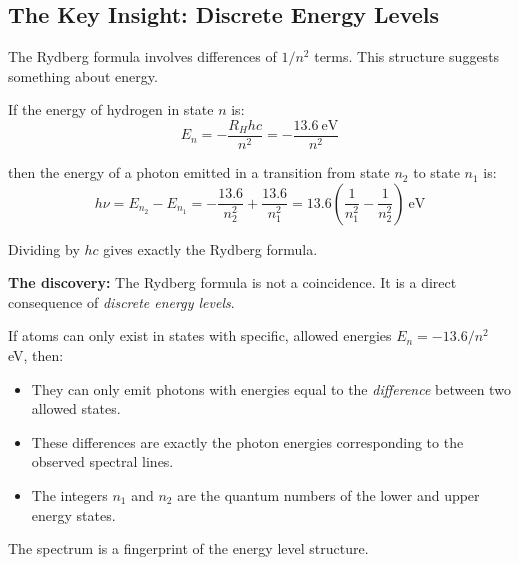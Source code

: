\documentclass[12pt, a4paper]{book}
\begin{document}
\subsection{The Key Insight: Discrete Energy Levels}

The Rydberg formula involves differences of $1/n^2$ terms.
This structure suggests something about energy.

If the energy of hydrogen in state $n$ is:
\[
  E_n = -\frac{R_H h c}{n^2} = -\frac{13.6\ \text{eV}}{n^2}
\]

then the energy of a photon emitted in a transition from
state $n_2$ to state $n_1$ is:
\[
  h\nu = E_{n_2} - E_{n_1}
        = -\frac{13.6}{n_2^2} + \frac{13.6}{n_1^2}
        = 13.6\left(\frac{1}{n_1^2} - \frac{1}{n_2^2}\right)\ \text{eV}
\]

Dividing by $hc$ gives exactly the Rydberg formula.

\begin{discoverybox}
\textbf{The discovery:} The Rydberg formula is not a coincidence.
It is a direct consequence of \emph{discrete energy levels}.

If atoms can only exist in states with specific, allowed energies
$E_n = -13.6/n^2$ eV, then:
\begin{itemize}[nosep, leftmargin=2em]
  \item They can only emit photons with energies equal to the
        \emph{difference} between two allowed states.
  \item These differences are exactly the photon energies
        corresponding to the observed spectral lines.
  \item The integers $n_1$ and $n_2$ are the quantum numbers
        of the lower and upper energy states.
\end{itemize}
The spectrum is a fingerprint of the energy level structure.
\end{discoverybox}
\end{document}
